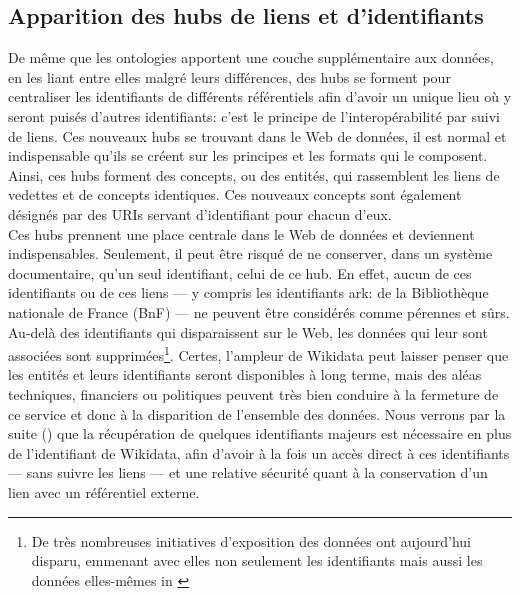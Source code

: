 \subsection{\label{III-A-2-b}Apparition des hubs de liens et d'identifiants}

De même que les ontologies apportent une couche supplémentaire aux données, en les liant entre elles malgré leurs différences, des hubs se forment pour centraliser les identifiants de différents référentiels afin d'avoir un unique lieu où y seront puisés d'autres identifiants: c'est le principe de l'interopérabilité par suivi de liens. Ces nouveaux hubs se trouvant dans le Web de données, il est normal et indispensable qu'ils se créent sur les principes et les formats qui le composent. Ainsi, ces hubs forment des concepts, ou des entités, qui rassemblent les liens de vedettes et de concepts identiques. Ces nouveaux concepts sont également désignés par des URIs servant d'identifiant pour chacun d'eux.\\

Ces hubs prennent une place centrale dans le Web de données et deviennent indispensables. Seulement, il peut être risqué de ne conserver, dans un système documentaire, qu'un seul identifiant, celui de ce hub. En effet, aucun de ces identifiants ou de ces liens --- y compris les identifiants ark: de la Bibliothèque nationale de France (BnF) --- ne peuvent être considérés comme pérennes et sûrs. Au-delà des identifiants qui disparaissent sur le Web, les données qui leur sont associées sont supprimées\footnote{\og De très nombreuses initiatives d’exposition des données ont aujourd’hui disparu, emmenant avec elles non seulement les identifiants mais aussi les données elles-mêmes\fg{} in \cite{poupeau_au-a_2018}}. Certes, l'ampleur de Wikidata peut laisser penser que les entités et leurs identifiants seront disponibles à long terme, mais des aléas techniques, financiers ou politiques peuvent très bien conduire à la fermeture de ce service et donc à la disparition de l'ensemble des données. Nous verrons par la suite () que la récupération de quelques identifiants majeurs est nécessaire en plus de l'identifiant de Wikidata, afin d'avoir à la fois un accès direct à ces identifiants --- sans suivre les liens --- et une relative sécurité quant à la conservation d'un lien avec un référentiel externe.\\

